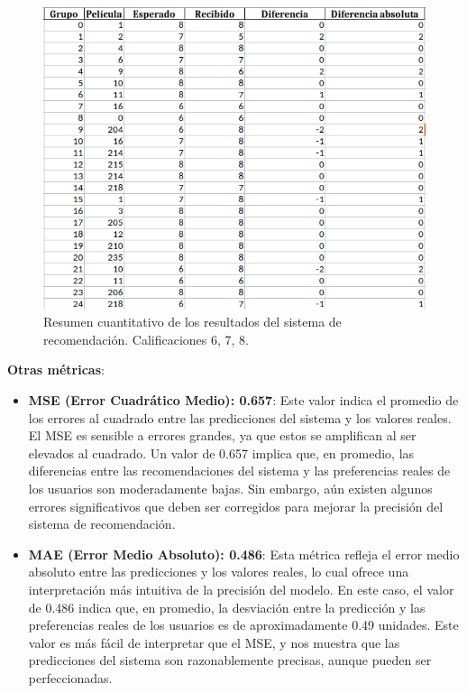 \documentclass[twocolumn, fontsize=10pt]{article}
\begin{document}
\begin{figure}[h]
    \centering
    \includegraphics[width=\columnwidth]{assets/tabla678.png}
    \caption{Resumen cuantitativo de los resultados del sistema de recomendación. Calificaciones 6, 7, 8.}
    \label{tab:resultados}
\end{figure}

\textbf{Otras métricas}:
\begin{itemize}
    \item \textbf{MSE (Error Cuadrático Medio): 0.657}: Este valor indica el promedio de los errores al cuadrado entre las predicciones del sistema y los valores reales. El MSE es sensible a errores grandes, ya que estos se amplifican al ser elevados al cuadrado. Un valor de 0.657 implica que, en promedio, las diferencias entre las recomendaciones del sistema y las preferencias reales de los usuarios son moderadamente bajas. Sin embargo, aún existen algunos errores significativos que deben ser corregidos para mejorar la precisión del sistema de recomendación.
    \item \textbf{MAE (Error Medio Absoluto): 0.486}: Esta métrica refleja el error medio absoluto entre las predicciones y los valores reales, lo cual ofrece una interpretación más intuitiva de la precisión del modelo. En este caso, el valor de 0.486 indica que, en promedio, la desviación entre la predicción y las preferencias reales de los usuarios es de aproximadamente 0.49 unidades. Este valor es más fácil de interpretar que el MSE, y nos muestra que las predicciones del sistema son razonablemente precisas, aunque pueden ser perfeccionadas.
\end{itemize}
\end{document}
